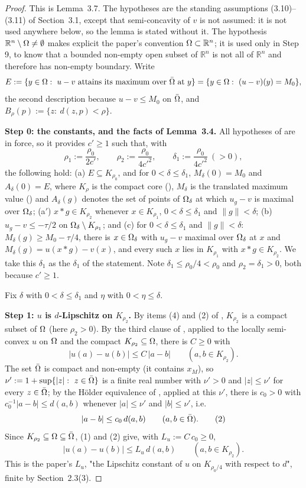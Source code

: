 \begin{proof}
This is Lemma~3.7. The hypotheses are the standing assumptions (3.10)--(3.11) of
Section~3.1, except that semi-concavity of $v$ is not assumed: it is not used anywhere
below, so the lemma is stated without it. The hypothesis $\mathbb R^{n}\setminus\Omega\ne\emptyset$
makes explicit the paper's convention $\Omega\subset\mathbb R^{n}$; it is used only in Step 9,
to know that a bounded non-empty open subset of $\mathbb R^{n}$ is not all of
$\mathbb R^{n}$ and therefore has non-empty boundary. Write
\[
 E:=\{y\in\Omega:\ u-v\ \text{attains its maximum over}\ \bar{\Omega}\ \text{at}\ y\}
 =\{y\in\Omega:\ (u-v)(y)=M_0\},
\]
the second description because $u-v\le M_0$ on $\bar{\Omega}$, and
$B_\rho(p):=\{z:\ d(z,p)<\rho\}$.

\medskip\noindent\textbf{Step 0: the constants, and the facts of Lemma~3.4.} All hypotheses
of  are in force, so it provides $c'\ge1$ such that, with
\[
 \rho_1:=\frac{\rho_0}{2c'},\qquad \rho_2:=\frac{\rho_0}{4c'^{2}},\qquad
 \delta_1:=\frac{\rho_0}{4c'^{2}}\ (>0),
\]
the following hold: (a) $E\subseteq K_{\rho_0}$, and for $0<\delta\le\delta_1$,
$M_\delta(0)=M_0$ and $A_\delta(0)=E$, where $K_\rho$ is the compact core
(), $M_\delta$ is the translated maximum value
() and $A_\delta(g)$ denotes the set of points of $\Omega_\delta$ at
which $u_g-v$ is maximal over $\Omega_\delta$; (a$'$) $x*g\in K_{\rho_2}$ whenever
$x\in K_{\rho_1}$, $0<\delta\le\delta_1$ and $\|g\|<\delta$; (b) $u_g-v\le-\tau/2$ on
$\Omega_\delta\setminus K_{\rho_1}$; and (c) for $0<\delta\le\delta_1$ and $\|g\|<\delta$:
$M_\delta(g)\ge M_0-\tau/4$, there is $x\in\Omega_\delta$ with $u_g-v$ maximal over $\Omega_\delta$
at $x$ and $M_\delta(g)=u(x*g)-v(x)$, and every such $x$ lies in $K_{\rho_1}$ with
$x*g\in K_{\rho_2}$. We take this $\delta_1$ as the $\delta_1$ of the statement. Note
$\delta_1\le\rho_0/4<\rho_0$ and $\rho_2=\delta_1>0$, both because $c'\ge1$.

Fix $\delta$ with $0<\delta\le\delta_1$ and $\eta$ with $0<\eta\le\delta$.

\medskip\noindent\textbf{Step 1: $u$ is $d$-Lipschitz on $K_{\rho_2}$.} By items (4) and (2)
of , $K_{\rho_2}$ is a compact subset of $\Omega$ (here
$\rho_2>0$). By the third clause of , applied to the locally
semi-convex $u$ on $\Omega$ and the compact $K_{\rho_2}\subseteq\Omega$, there is $C\ge0$ with
\[
 |u(a)-u(b)|\le C\,|a-b|\qquad(a,b\in K_{\rho_2}). \tag{1}
\]
The set $\bar{\Omega}$ is compact and non-empty (it contains $x_M$), so
$\nu':=1+\sup\{|z|:\ z\in\bar{\Omega}\}$ is a finite real number with $\nu'>0$ and $|z|\le\nu'$
for every $z\in\bar{\Omega}$; by the
Hölder equivalence of , applied at this $\nu'$, there is $c_0>0$ with
$c_0^{-1}|a-b|\le d(a,b)$ whenever $|a|\le\nu'$ and $|b|\le\nu'$, i.e.
\[
 |a-b|\le c_0\,d(a,b)\qquad(a,b\in\bar{\Omega}). \tag{2}
\]
Since $K_{\rho_2}\subseteq\Omega\subseteq\bar{\Omega}$, (1) and (2) give, with $L_u:=C\,c_0\ge0$,
\[
 |u(a)-u(b)|\le L_u\,d(a,b)\qquad(a,b\in K_{\rho_2}). \tag{3}
\]
This is the paper's $L_u$, "the Lipschitz constant of $u$ on $K_{\rho_0/4}$ with respect to
$d$", finite by Section~2.3(3).


\end{proof}
